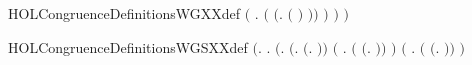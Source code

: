\begin{SaveVerbatim}{HOLCongruenceDefinitionsWGXXdef}
                 \ensuremath{(}\HOLSymConst{\HOLTokenExists{}} . \ensuremath{(} \HOLSymConst{\ensuremath{=}} \ensuremath{(}\HOLTokenLambda{}.  \ensuremath{(} \ensuremath{)} \ensuremath{)}\ensuremath{)} \HOLSymConst{\HOLTokenConj{}}  \ensuremath{)} \HOLSymConst{\HOLTokenImp{}}
                  \ensuremath{)} \HOLSymConst{\HOLTokenImp{}}
             \ensuremath{)}
\end{SaveVerbatim}
\newcommand{\HOLCongruenceDefinitionsWGXXdef}{\UseVerbatim{HOLCongruenceDefinitionsWGXXdef}}
\begin{SaveVerbatim}{HOLCongruenceDefinitionsWGSXXdef}
\HOLTokenTurnstile{}  \HOLSymConst{\ensuremath{=}}
   \ensuremath{(}\HOLTokenLambda{}.
        \HOLSymConst{\HOLTokenForall{}}.
            \ensuremath{(}\HOLSymConst{\HOLTokenForall{}}.
                 \ensuremath{(}\HOLSymConst{\HOLTokenExists{}}.  \HOLSymConst{\ensuremath{=}} \ensuremath{(}\HOLTokenLambda{}. \ensuremath{)}\ensuremath{)} \HOLSymConst{\HOLTokenDisj{}}
                 \ensuremath{(}\HOLSymConst{\HOLTokenExists{}} . \ensuremath{(} \HOLSymConst{\ensuremath{=}} \ensuremath{(}\HOLTokenLambda{}. \HOLSymConst{\ensuremath{\ldotp}} \ensuremath{)}\ensuremath{)} \HOLSymConst{\HOLTokenConj{}}  \ensuremath{)} \HOLSymConst{\HOLTokenDisj{}}
                 \ensuremath{(}\HOLSymConst{\HOLTokenExists{}}   .
                      \ensuremath{(} \HOLSymConst{\ensuremath{=}} \ensuremath{(}\HOLTokenLambda{}. \HOLSymConst{\ensuremath{\ldotp}}  \HOLSymConst{\ensuremath{+}} \HOLSymConst{\ensuremath{\ldotp}} \ensuremath{)}\ensuremath{)} \HOLSymConst{\HOLTokenConj{}}
                        \HOLSymConst{\HOLTokenConj{}}  \ensuremath{)} \HOLSymConst{\HOLTokenDisj{}}

\end{SaveVerbatim}
